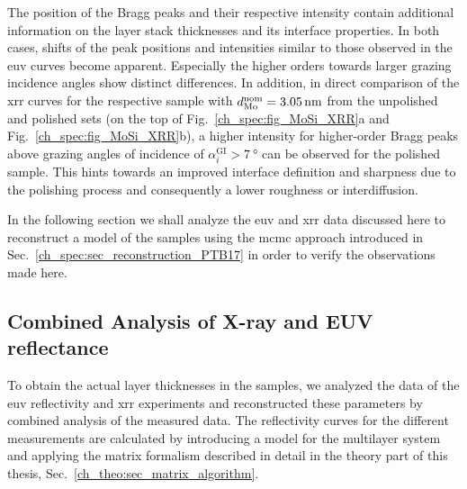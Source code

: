 The position of the Bragg peaks and their respective intensity contain additional information on the layer stack thicknesses and its interface properties. In both cases, shifts of the peak positions and intensities similar to those observed in the \gls{euv} curves become apparent. Especially the higher orders towards larger grazing incidence angles show distinct differences. In addition, in direct comparison of the \gls{xrr} curves for the respective sample with $d_\text{Mo}^\text{nom} = \nm{3.05}$ from the unpolished and polished sets (on the top of Fig.~\ref{ch_spec:fig_MoSi_XRR}a and Fig.~\ref{ch_spec:fig_MoSi_XRR}b), a higher intensity for higher-order Bragg peaks above grazing angles of incidence of $\alpha_i^\text{GI} > \SI{7}{\degree}$ can be observed for the polished sample. This hints towards an improved interface definition and sharpness due to the polishing process and consequently a lower roughness or interdiffusion.

In the following section we shall analyze the \gls{euv} and \gls{xrr} data discussed here to reconstruct a model of the samples using the \gls{mcmc} approach introduced in Sec.~\ref{ch_spec:sec_reconstruction_PTB17} in order to verify the observations made here.

\subsection{Combined Analysis of X-ray and EUV reflectance} \label{ch_spec:sec_MoSi_euv_xrr_combined}
To obtain the actual layer thicknesses in the samples, we analyzed the data of the \gls{euv} reflectivity and \gls{xrr} experiments and reconstructed these parameters by combined analysis of the measured data. The reflectivity curves for the different measurements are calculated by introducing a model for the multilayer system and applying the matrix formalism described in detail in the theory part of this thesis, Sec.~\ref{ch_theo:sec_matrix_algorithm}.

